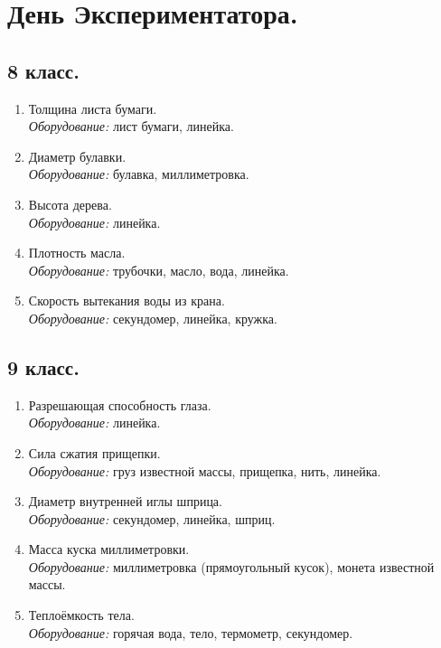 \documentclass[12pt]{article}
\newlength{\h}
\newlength{\x}
\begin{document}
\clearpage

\section{День Экспериментатора. }
\label{sec:dayexp}

\subsection{8 класс. }
\label{sec:dayexp8}

\begin{enumerate}
\item Толщина листа бумаги.\\
  \textit{Оборудование:} лист бумаги, линейка.
\item Диаметр булавки. \\
  \textit{Оборудование:} булавка, миллиметровка.
\item Высота дерева.\\
  \textit{Оборудование:} линейка.
\item Плотность масла.\\
  \textit{Оборудование:} трубочки, масло, вода, линейка.
\item Скорость вытекания воды из крана.\\
  \textit{Оборудование:} секундомер, линейка, кружка.
\end{enumerate}

\subsection{9 класс.}
\label{sec:dayexp9}

\begin{enumerate}
\item Разрешающая способность глаза.\\
  \textit{Оборудование:} линейка.
\item Сила сжатия прищепки. \\
  \textit{Оборудование:} груз известной массы, прищепка, нить, линейка.
\item Диаметр внутренней иглы шприца. \\
  \textit{Оборудование:} секундомер, линейка, шприц.
\item Масса куска миллиметровки. \\
  \textit{Оборудование:} миллиметровка (прямоугольный кусок), монета
  известной массы. 
\item Теплоёмкость тела.\\
  \textit{Оборудование:} горячая вода, тело, термометр, секундомер.
\end{enumerate}
\end{document}
